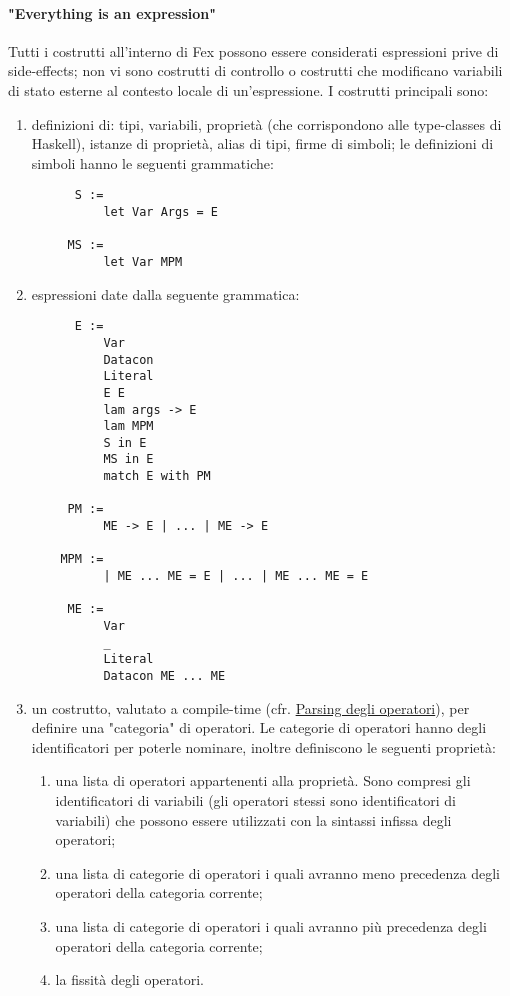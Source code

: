 \documentclass[10pt,a4paper]{article}
\begin{document}
\paragraph{"Everything is an expression"}
Tutti i costrutti all'interno di Fex possono essere considerati espressioni
prive di side-effects; non vi sono costrutti di controllo o costrutti che modificano variabili di stato esterne
al contesto locale di un'espressione. I costrutti principali sono:
    \begin{enumerate}
    \item definizioni di: tipi, variabili, proprietà (che corrispondono alle type-classes di Haskell), istanze di
    proprietà, alias di tipi, firme di simboli; le definizioni di simboli hanno le seguenti grammatiche:
    \begin{lstlisting}
      S :=
          let Var Args = E

     MS :=
          let Var MPM
    \end{lstlisting}
    \item espressioni date dalla seguente grammatica:
    \begin{lstlisting}
      E :=
          Var
          Datacon
          Literal
          E E
          lam args -> E
          lam MPM
          S in E
          MS in E
          match E with PM

     PM :=
          ME -> E | ... | ME -> E

    MPM :=
          | ME ... ME = E | ... | ME ... ME = E

     ME :=
          Var
          _
          Literal
          Datacon ME ... ME
    \end{lstlisting}
    \item un costrutto, valutato a compile-time (cfr. \hyperlink{Parsing degli operatori}{Parsing degli operatori}),
    per definire una "categoria" di
    operatori. Le categorie di operatori hanno degli identificatori per poterle nominare, inoltre definiscono le
    seguenti proprietà:
        \begin{enumerate}
        \item una lista di operatori appartenenti alla proprietà. Sono compresi gli identificatori di variabili (gli
        operatori stessi sono identificatori di variabili) che possono essere utilizzati con la sintassi infissa degli
        operatori;
        \item una lista di categorie di operatori i quali avranno meno precedenza degli operatori della categoria
        corrente;
        \item una lista di categorie di operatori i quali avranno più precedenza degli operatori della categoria
        corrente;
        \item la fissità degli operatori.
        \end{enumerate}
    \end{enumerate}
\end{document}
